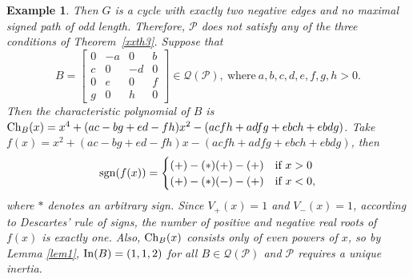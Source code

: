 \documentclass[a4paper, 10pt]{article}
\newtheorem{eg}{Example}[section]
\numberwithin{equation}{section}
\def\sgn{{\rm sgn}}
\def\In{{\rm In}}
\def\Ch{{\rm Ch}}
\begin{document}
\begin{eg}
	Then $G$ is a cycle with exactly two negative edges and no maximal signed path of odd length. Therefore, $\mathcal{P}$ does not satisfy any of the three conditions
	of Theorem~\ref{xxth3}. Suppose that
	$$B=\begin{bmatrix}
		0&-a&0&b\\c&0&-d&0\\0&e&0&f\\g&0&h&0
	\end{bmatrix}\in \mathcal{Q}(\mathcal{P}),~\text{where}~a,b,c,d,e,f,g,h>0.$$
	Then the characteristic polynomial of $B$ is $\Ch_B(x)=x^4+(ac-bg+ed-fh)x^2-(acfh+adfg+ebch+ebdg)$. Take $f(x)=x^2+(ac-bg+ed-fh)x-(acfh+adfg+ebch+ebdg)$, then
	$$ 
	\sgn(f(x)) =  \begin{cases} 
		(+)-(*)(+)-(+) & \text{if} ~ x> 0 \\
		(+)-(*)(-)-(+) & \text{if} ~x<0,
	\end{cases} 
	$$ where $*$ denotes an arbitrary sign. Since $V_+(x)=1$ and $V_-(x)=1$, according to Descartes’ rule of signs, the number of positive and negative real roots of $f(x)$ is exactly one. Also, $\Ch_{B}(x)$ consists only of even powers of $x$, so by Lemma \ref{lem1}, $\In(B)=(1,1,2)$ for all $B\in \mathcal{Q}(\mathcal{P})$ and $\mathcal{P}$ requires a unique inertia.
\end{eg}
\end{document}
